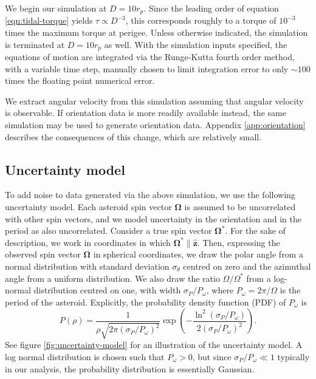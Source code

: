 \documentclass[fleqn,usenatbib]{mnras}
\renewcommand{\unit}[1]{\bm{\hat{#1}}}
\newcommand{\parens}[1]{\left( #1 \right)}
\begin{document}
We begin our simulation at $D = 10 r_p$. Since the leading order of equation \ref{eqn:tidal-torque} yields $\tau \propto D^{-3}$, this corresponds roughly to a torque of $10^{-3}$ times the maximum torque at perigee. Unless otherwise indicated, the simulation is terminated at $D=10 r_p$ as well. With the simulation inputs specified, the equations of motion are integrated via the Runge-Kutta fourth order method, with a variable time step, manually chosen to limit integration error to only $\sim 100$ times the floating point numerical error.

We extract angular velocity from this simulation assuming that angular velocity is observable. If orientation data is more readily available instead, the same simulation may be used to generate orientation data. Appendix \ref{app:orientation} describes the consequences of this change, which are relatively small.



\subsection{Uncertainty model}
\label{sec:uncertainty}

To add noise to data generated via the above simulation, we use the following uncertainty model. Each asteroid spin vector $\bm \Omega$ is assumed to be uncorrelated with other spin vectors, and we model uncertainty in the orientation and in the period as also uncorrelated. Consider a true spin vector $\bm \Omega^*$. For the sake of description, we work in coordinates in which $\bm \Omega^* \parallel \unit z$. Then, expressing the observed spin vector $\bm \Omega$ in spherical coordinates, we draw the polar angle from a normal distribution with standard deviation $\sigma_\theta$ centred on zero and the azimuthal angle from a uniform distribution. We also draw the ratio $\Omega/\Omega^*$ from a log-normal distribution centred on one, with width $\sigma_P / P_\omega$, where $P_\omega = 2\pi / \Omega$ is the period of the asteroid. Explicitly, the probability density function (PDF) of $P_\omega$ is 
\begin{equation}
  P(\rho) = \frac{1}{\rho\sqrt{2\pi (\sigma_P / P_\omega)^2}} \exp\parens{-\frac{\ln^2(\sigma_P / P_\omega)}{2(\sigma_P / P_\omega)^2}}.
\end{equation}
See figure \ref{fig:uncertainty-model} for an illustration of the uncertainty model. A log normal distribution is chosen such that $P_\omega > 0$, but since $\sigma_P/P_\omega \ll 1$ typically in our analysis, the probability distribution is essentially Gaussian.
\end{document}
